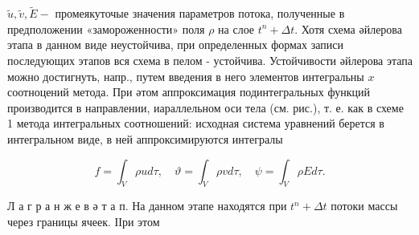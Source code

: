 \documentclass[10pt]{article}
\begin{document}
$\tilde{u}, \tilde{v}, \tilde{E}-$ промеякуточые значения параметров потока, полученные в предположении «замороженности» поля $\rho$ на слое $t^{n}+\Delta t$. Хотя схема әйлерова этапа в данном виде неустойчива, при определенных формах записи последующих этапов вся схема в пелом - устойчива. Устойчивости әйлерова этапа можно достигнуть, напр., путем введения в него элементов интегральны $x$ соотноцений метода. При әтом аппроксимация подинтегральных функций производится в направлении, иараллельном оси тела (см. рис.), т. е. как в схеме 1 метода интегральных соотношений: исходная система уравнений берется в интегральном виде, в ней аппроксимируются интегралы



\[

f=\int_{V} \rho u d \tau, \quad \vartheta=\int_{V} \rho v d \tau, \quad \psi=\int_{V} \rho E d \tau .

\]



Л а г р а н ж е в ә т а п. На данном этапе находятся при $t^{n}+\Delta t$ потоки массы через границы ячеек. ІІри этом
\end{document}
